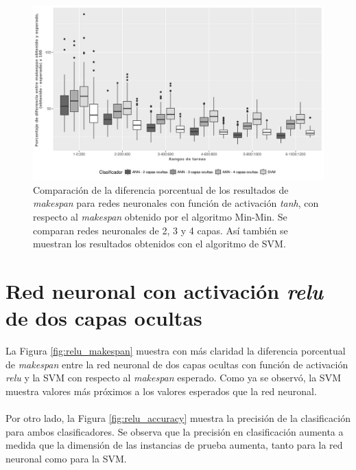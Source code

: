 \begin{figure}[H]
  \centering
  \includegraphics[width=\columnwidth]{imagenes/comparacion_anns_tanh.png}
  \caption{Comparación de  la diferencia porcentual  de los resultados de \textit{makespan} para redes neuronales con función de activación \textit{tanh}, con respecto al \textit{makespan} obtenido por el algoritmo Min-Min. Se comparan redes neuronales de 2, 3 y 4 capas. Así también se muestran los resultados obtenidos con el algoritmo de SVM.}
  \label{fig:tanh234}
\end{figure}

\section{Red neuronal con activación \textit{relu} de dos capas ocultas}

La Figura \ref{fig:relu_makespan} muestra con más claridad la diferencia porcentual de \textit{makespan} entre la red neuronal de dos capas ocultas con función de activación \textit{relu} y la SVM con respecto al \textit{makespan} esperado. Como ya se observó, la SVM muestra valores más próximos a los valores esperados que la red neuronal. 

\paragraph{} Por otro lado, la Figura \ref{fig:relu_accuracy} muestra la precisión de la clasificación para ambos clasificadores. Se observa que la precisión en clasificación aumenta a medida que la dimensión de las instancias de prueba aumenta, tanto para la red neuronal como para la SVM. 

